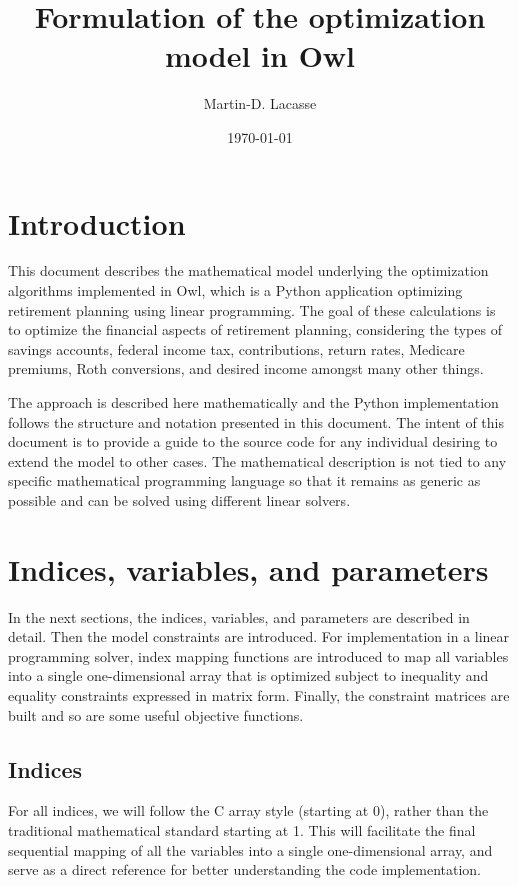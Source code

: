 \documentclass{report}[fleqn,11pt]
\begin{document}
\title{Formulation of the optimization model in Owl}
\author{Martin-D. Lacasse}
\date{\today}
\maketitle
\thispagestyle{fancy}
\fancyhead{}

\chapter{Introduction}
This document describes the mathematical model underlying
the optimization algorithms implemented in
Owl, which is a Python application optimizing retirement
planning using linear programming. The goal of
these calculations is to optimize the financial aspects
of retirement planning, considering the types of savings accounts,
federal income tax, contributions, return rates, Medicare premiums, Roth conversions,
and desired income amongst many other things.

The approach is described here mathematically and the Python implementation
follows the structure and notation presented in this document.
The intent of this document is to provide a guide to the source code
for any individual desiring to extend the model to other cases.
The mathematical description is not tied to any specific mathematical
programming language so that it remains as generic as possible and
can be solved using different linear solvers.

\chapter{Indices, variables, and parameters}
In the next sections, the indices, variables, and parameters are
described in detail. Then the model constraints are introduced.
For implementation in a linear programming solver, index mapping
functions are introduced to map all variables into a single
one-dimensional array that
is optimized subject to inequality and equality constraints
expressed in matrix form. Finally, the constraint matrices are built
and so are some useful objective functions.

\section{Indices}
For all indices, we will follow the C array style (starting at 0),
rather than the traditional mathematical standard starting at 1.
This will facilitate the final
sequential mapping of all the variables into a single one-dimensional array,
and serve as a direct reference for better understanding the code implementation.
\end{document}
